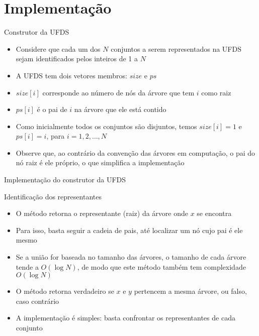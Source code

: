 \section{Implementação}

\begin{frame}[fragile]{Construtor da UFDS}

    \begin{itemize}
        \item Considere que cada um dos $N$ conjuntos a serem representados na UFDS sejam
            identificados pelos inteiros de 1 a $N$

        \item A UFDS tem dois vetores membros: $size$ e $ps$

        \item $size[i]$ corresponde ao número de nós da árvore que tem $i$ como raiz

        \item $ps[i]$ é o pai de $i$ na árvore que ele está contido

        \item Como inicialmente todos os conjuntos são disjuntos, temos $size[i] = 1$
            e $ps[i] = i$, para $i = 1, 2, \ldots, N$

        \item Observe que, ao contrário da convenção das árvores em computação, o pai do nó raiz
            é ele próprio, o que simplifica a implementação

    \end{itemize}

\end{frame}

\begin{frame}[fragile]{Implementação do construtor da UFDS}
\end{frame}

\begin{frame}[fragile]{Identificação dos representantes}

    \begin{itemize}
        \item O método  retorna o representante (raiz) da árvore onde 
            $x$ se encontra

        \item Para isso, basta seguir a cadeia de pais, até localizar um nó cujo pai é ele
            mesmo

        \item Se a união for baseada no tamanho das árvores, o tamanho de cada árvore tende a
            $O(\log N)$, de modo que este método também tem complexidade $O(\log N)$

        \item O método  retorna verdadeiro se $x$ e $y$ pertencem a 
            mesma árvore, ou falso, caso contrário

        \item A implementação é simples: basta confrontar os representantes de cada conjunto
    \end{itemize}

\end{frame}

